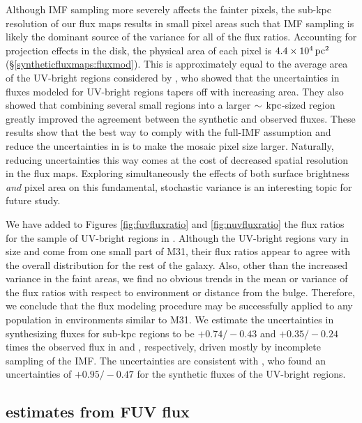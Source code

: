\documentclass[iop, tighten]{emulateapj}
\begin{document}
Although IMF sampling more severely affects the fainter pixels, the sub-kpc
resolution of our flux maps results in small pixel areas such that IMF sampling
is likely the dominant source of the variance for all of the flux ratios.
Accounting for projection effects in the disk, the physical area of each pixel
is $4.4\times 10^4\,\mathrm{pc}^2$ (\S \ref{syntheticfluxmaps:fluxmod}). This is
approximately equal to the average area of the UV-bright regions considered by
\citet{Simones:2014}, who showed that the uncertainties in fluxes modeled for
UV-bright regions tapers off with increasing area. They also showed that
combining several small regions into a larger $\sim\,\mathrm{kpc}$-sized region greatly
improved the agreement between the synthetic and observed fluxes. These results
show that the best way to comply with the full-IMF assumption and reduce the
uncertainties in \fxsfh{} is to make the mosaic pixel size larger. Naturally,
reducing uncertainties this way comes at the cost of decreased spatial
resolution in the flux maps. Exploring simultaneously the effects of both
surface brightness \emph{and} pixel area on this fundamental, stochastic
variance is an interesting topic for future study.

We have added to Figures \ref{fig:fuvfluxratio} and \ref{fig:nuvfluxratio} the
flux ratios for the sample of UV-bright regions in \citet{Simones:2014}.
Although the UV-bright regions vary in size and come from one small part of
M31, their flux ratios appear to agree with the overall distribution for the
rest of the galaxy. Also, other than the increased variance in the faint areas,
we find no obvious trends in the mean or variance of the flux ratios with
respect to environment or distance from the bulge. Therefore, we conclude that
the flux modeling procedure may be successfully applied to any population in
environments similar to M31. We estimate the uncertainties in synthesizing
fluxes for sub-kpc regions to be $+\!0.74/\!-\!0.43$ and $+\!0.35/\!-\!0.24$
times the observed flux in \fuv{} and \nuv{}, respectively, driven mostly by
incomplete sampling of the IMF. The \ffuvsfh{} uncertainties are consistent
with \citet{Simones:2014}, who found an uncertainties of $+\!0.95/\!-\!0.47$
for the synthetic \fuv{} fluxes of the UV-bright regions.



\subsection{\sfr{} estimates from FUV flux}
\end{document}
